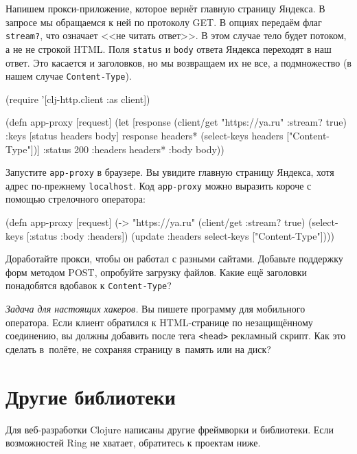 Напишем прокси-приложение, которое вернёт главную страницу Яндекса. В
запросе мы обращаемся к ней по протоколу GET. В опциях передаём флаг
\verb|stream?|, что означает <<не читать ответ>>. В этом случае тело будет
потоком, а не не строкой HTML. Поля \verb|status| и \verb|body| ответа
Яндекса переходят в наш ответ. Это касается и заголовков, но мы возвращаем их не
все, а подмножество (в нашем случае \verb|Content-Type|).

\begin{english}
  \begin{clojure}
(require '[clj-http.client :as client])

(defn app-proxy [request]
  (let [response (client/get "https://ya.ru" {:stream? true})
        {:keys [status headers body]} response
        headers* (select-keys headers ["Content-Type"])]
    {:status 200
     :headers headers*
     :body body}))
  \end{clojure}
\end{english}

Запустите \verb|app-proxy| в браузере. Вы увидите главную страницу Яндекса,
хотя адрес по-прежнему \verb|localhost|. Код \verb|app-proxy| можно выразить
короче с помощью стрелочного оператора:

\begin{english}
  \begin{clojure}
(defn app-proxy [request]
  (-> "https://ya.ru"
      (client/get {:stream? true})
      (select-keys [:status :body :headers])
      (update :headers select-keys ["Content-Type"])))
  \end{clojure}
\end{english}

Доработайте прокси, чтобы он работал с разными сайтами. Добавьте поддержку форм
методом POST, опробуйте загрузку файлов. Какие ещё заголовки понадобятся
вдобавок к \verb|Content-Type|?

\emph{Задача для настоящих хакеров.} Вы пишете программу для мобильного
оператора. Если клиент обратился к HTML-странице по незащищённому соединению, вы
должны добавить после тега \verb|<head>| рекламный скрипт. Как это сделать
в~полёте, не сохраняя страницу в~память или на диск?

\section{Другие библиотеки}

Для веб-разработки Clojure написаны другие фреймворки и библиотеки. Если
возможностей Ring не хватает, обратитесь к проектам ниже.

